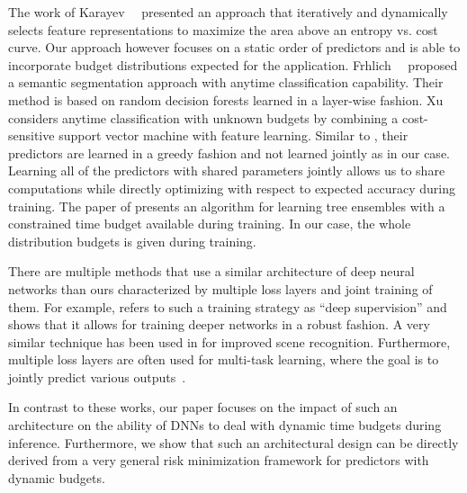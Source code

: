 \documentclass{bmvc2k}
\begin{document}
    The work of Karayev~\etal~\cite{karayev2014anytime} presented an approach that iteratively
    and dynamically selects feature representations to maximize the area above an entropy vs. cost curve.
    Our approach however focuses on a static order of predictors and is able to incorporate
    budget distributions expected for the application.
    Frhlich~\etal~\cite{Froehlich12:ATG} proposed a semantic segmentation approach
    with anytime classification capability. Their method is based on random decision forests
    learned in a layer-wise fashion.
    Xu~\etal~\cite{xu2013anytime} considers anytime classification with unknown budgets by
    combining a cost-sensitive support vector machine with feature learning.
    Similar to \cite{Froehlich12:ATG}, their predictors are learned in a greedy fashion and not learned jointly as in our case.
    Learning all of the predictors with shared parameters jointly allows us to share computations while
    directly optimizing with respect to expected accuracy during training.
    The paper of \cite{xu2012greedy} presents an algorithm for learning tree ensembles
    with a constrained time budget available during training. In our case, the whole distribution
    budgets is given during training.

    There are multiple methods that use a similar architecture of deep neural networks
    than ours characterized by multiple loss layers and joint training of them.
    For example, \cite{wang2015training} refers to such a training strategy as
    ``deep supervision'' and shows that it allows for training deeper networks in a robust fashion.
    A very similar technique has been used in \cite{guo2016locally} for improved scene recognition.
    Furthermore, multiple loss layers are often used for multi-task learning, where the goal is
    to jointly predict various outputs~\cite{zhang2016learning}.


    In contrast to these works, our paper focuses on the impact of such an architecture
    on the ability of DNNs to deal with dynamic time budgets during inference. Furthermore,
    we show that such an architectural design can be directly derived from a very general
    risk minimization framework for predictors with dynamic budgets.

\end{document}
